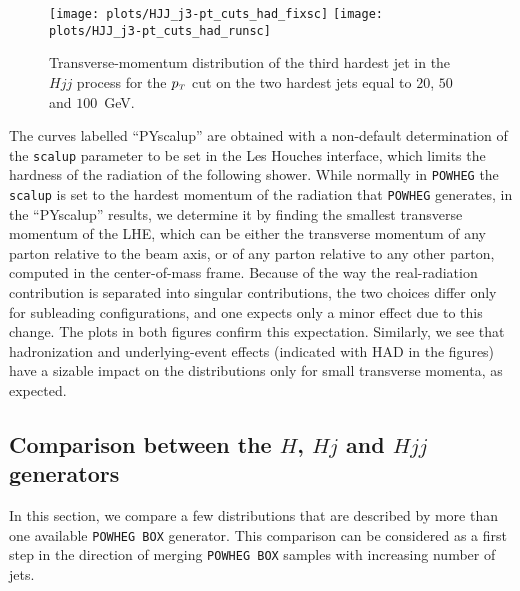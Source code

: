 \documentclass[paper]{JHEP3}
\newlength{\hfig}
\newlength{\hfigs}
\newcommand\HqT{{\tt HqT}}
\newcommand\mH{m_{\sss  H}}
\newcommand\sss{\mathchoice%
{\displaystyle}%
{\scriptstyle}%
{\scriptscriptstyle}%
{\scriptscriptstyle}%
}
\newcommand\pT{p_{\sss T}}
\newcommand\POWHEG{{\tt POWHEG}}
\newcommand\POWHEGBOX{{\tt POWHEG BOX}}
\begin{document}
\begin{figure}[htb]
\begin{center}
\texttt{[image: plots/HJJ\_j3-pt\_cuts\_had\_fixsc]}  \nolinebreak
\texttt{[image: plots/HJJ\_j3-pt\_cuts\_had\_runsc]} 
\caption{Transverse-momentum distribution of the third hardest jet in the
  $Hjj$ process for the $\pT$ cut on the two hardest jets equal
  to $20$, $50$ and $100$~GeV.}
\label{fig:HJJ_j3-pt_had_cuts}
\end{center}
\end{figure}
The curves labelled ``PYscalup'' are obtained with a non-default
determination of the {\tt scalup} parameter to be set in the Les Houches
interface, which limits the hardness of the radiation of the following
shower. While normally in \POWHEG{} the {\tt scalup} is set to the hardest
momentum of the radiation that \POWHEG{} generates, in the ``PYscalup''
results, we determine it by finding the smallest transverse momentum of the
LHE, which can be either the transverse momentum of any parton relative to
the beam axis, or of any parton relative to any other parton, computed in the
center-of-mass frame. Because of the way the real-radiation contribution is
separated into singular contributions, the two choices differ only for
subleading configurations, and one expects only a minor effect due to this
change.  The plots in both figures confirm this expectation. Similarly, we
see that hadronization and underlying-event effects (indicated with HAD in
the figures) have a sizable impact on the distributions only for small
transverse momenta, as expected.

\subsection{Comparison between the $H$, $Hj$ and $Hjj$ generators}
In this section, we compare a few distributions that are described by more
than one available \POWHEGBOX{} generator. This comparison can be considered
as a first step in the direction of merging \POWHEGBOX{} samples with
increasing number of jets.


\end{document}
